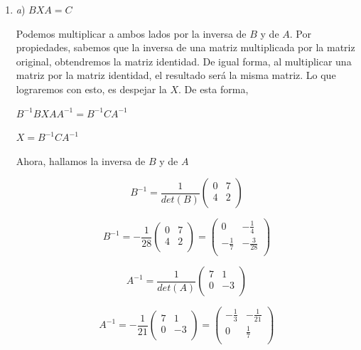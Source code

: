 \documentclass[11pt,a4paper]{article}
\begin{document}
\begin{enumerate}
\begin{displaymath}
\begin{array}{|c|c|}
\end{array}
\end{displaymath}

En este caso, el resultado sí es una tautología. Por esto, la afirmación es \textbf{verdadera}

\item

\textit{a}) $BXA = C$

Podemos multiplicar a ambos lados por la inversa de $B$ y de $A$. Por propiedades, sabemos que la inversa de una matriz multiplicada por la matriz original, obtendremos la matriz identidad. De igual forma, al multiplicar una matriz por la matriz identidad, el resultado será la misma matriz. Lo que lograremos con esto, es despejar la $X$. De esta forma, 

\begin{center}

$B^{-1}B X AA^{-1} = B^{-1} C A^{-1}$

$X =  B^{-1} C A^{-1}$

\end{center}

Ahora, hallamos la inversa de $B$ y de $A$

$$
B^{-1} = \frac{1}{det(B)}
\begin{pmatrix} 
0 & 7 \\
4 & 2 \\
\end{pmatrix}
$$

$$
B^{-1} = -\frac{1}{28}
\begin{pmatrix} 
0 & 7 \\
4 & 2 \\
\end{pmatrix}
= 
\begin{pmatrix} 
0 & -\frac{1}{4} \\
-\frac{1}{7}  & -\frac{3}{28} \\
\end{pmatrix}
$$


$$
A^{-1} = \frac{1}{det(A)}
\displaystyle
\begin{pmatrix} 
7 & 1 \\
0 & -3 \\
\end{pmatrix}
$$

$$
A^{-1} = -\frac{1}{21}
\begin{pmatrix} 
7 & 1 \\
0 & -3 \\
\end{pmatrix}
= 
\begin{pmatrix} 
-\frac{1}{3} & -\frac{1}{21} \\
0  & \frac{1}{7} \\
\end{pmatrix}
$$


\end{enumerate}
\end{document}

